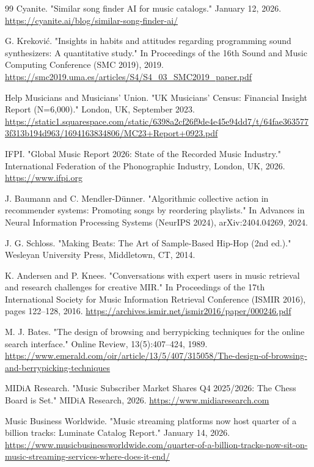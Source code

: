 \begin{thebibliography}{99}
  Cyanite.
  "Similar song finder AI for music catalogs."
  January 12, 2026. \url{https://cyanite.ai/blog/similar-song-finder-ai/}

  G. Krekovi\'c.
  "Insights in habits and attitudes regarding programming sound synthesizers: A quantitative study."
  In Proceedings of the 16th Sound and Music Computing Conference (SMC 2019), 2019. \url{https://smc2019.uma.es/articles/S4/S4_03_SMC2019_paper.pdf}

  Help Musicians and Musicians' Union.
  "UK Musicians' Census: Financial Insight Report (N=6,000)."
  London, UK, September 2023. \url{https://static1.squarespace.com/static/6398a2cf26f9de4e45e94dd7/t/64fae3635773f313b194d963/1694163834806/MC23+Report+0923.pdf}

  IFPI.
  "Global Music Report 2026: State of the Recorded Music Industry."
  International Federation of the Phonographic Industry, London, UK, 2026. \url{https://www.ifpi.org}

  J. Baumann and C. Mendler-D\"{u}nner.
  "Algorithmic collective action in recommender systems: Promoting songs by reordering playlists."
  In Advances in Neural Information Processing Systems (NeurIPS 2024), arXiv:2404.04269, 2024.

  J. G. Schloss.
  "Making Beats: The Art of Sample-Based Hip-Hop (2nd ed.)."
  Wesleyan University Press, Middletown, CT, 2014.

  K. Andersen and P. Knees.
  "Conversations with expert users in music retrieval and research challenges for creative MIR."
  In Proceedings of the 17th International Society for Music Information Retrieval Conference (ISMIR 2016), pages 122--128, 2016. \url{https://archives.ismir.net/ismir2016/paper/000246.pdf}

  M. J. Bates.
  "The design of browsing and berrypicking techniques for the online search interface."
  Online Review, 13(5):407--424, 1989. \url{https://www.emerald.com/oir/article/13/5/407/315058/The-design-of-browsing-and-berrypicking-techniques}

  MIDiA Research.
  "Music Subscriber Market Shares Q4 2025/2026: The Chess Board is Set."
  MIDiA Research, 2026. \url{https://www.midiaresearch.com}

  Music Business Worldwide.
  "Music streaming platforms now host quarter of a billion tracks: Luminate Catalog Report."
  January 14, 2026. \url{https://www.musicbusinessworldwide.com/quarter-of-a-billion-tracks-now-sit-on-music-streaming-services-where-does-it-end/}


\end{thebibliography}

